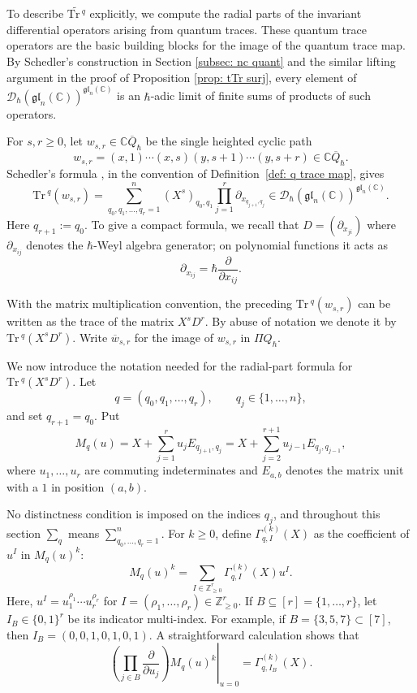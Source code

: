 \documentclass[11pt,reqno]{amsart}
\theoremstyle{definition}
\newcommand{\bbC}{\mathbb{C}}
\newcommand{\bbZ}{\mathbb{Z}}
\newcommand{\gl}{\mathfrak{gl}}
\newcommand{\Tr}{\mathrm{Tr} \,}
\newcommand{\mD}{\mathcal{D}}
\newcommand{\qneck}{{\mathbb{C} \overline{Q}}_{\hbar}}
\begin{document}
To describe \(\widetilde{\Tr^q}\) explicitly, we compute the radial parts of the
invariant differential operators arising from quantum traces.
These quantum trace operators are the basic building blocks for the image of the quantum trace map.
By Schedler's construction in Section \ref{subsec: nc quant} and the similar lifting argument in the proof of Proposition \ref{prop: tTr surj},
every element of
\(\mD_\hbar (\gl_n (\bbC))^{\gl_n (\bbC)}\) is an
\(\hbar\)-adic limit of finite sums of products of such operators.


For \(s,r \geq 0\), let \(w_{s,r}\in\qneck\) be the
single heighted cyclic path
\[
w_{s,r}
=
(x,1)\cdots(x,s)(y,s+1)\cdots(y,s+r) \in \qneck.
\]
Schedler's formula \cite[Eq.~(3.12)]{Sch2005}, in the convention of
Definition~\ref{def: q trace map}, gives
\begin{equation}\label{for: trace w_sr}
	\Tr^q(w_{s,r})
	=
	\sum_{q_0,q_1,\ldots,q_r=1}^n
	(X^s)_{q_0,q_1}
	\prod_{j=1}^r\partial_{x_{q_{j+1},q_j}}
	\in\mD_\hbar(\gl_n (\bbC))^{\gl_n (\bbC)}.
\end{equation}
Here \(q_{r+1}:=q_0\).
To give a compact formula, we recall that
\(
	D=(\partial_{x_{ji}})
\)
where \(\partial_{x_{ij}}\) denotes the
\(\hbar\)-Weyl algebra generator; on polynomial functions it acts as
\[
\partial_{x_{ij}}
=
\hbar\frac{\partial}{\partial x_{ij}}.
\]

With the matrix multiplication convention, the preceding \(\Tr^q(w_{s,r})\) can be written as the trace of the matrix \(X^s D^r\).
By abuse of notation we denote it by
\(\Tr^q(X^sD^r)\).  
Write \(\overline w_{s,r}\) for the image of \(w_{s,r}\) in
\(\Pi Q_{\hbar}\).




We now introduce the notation needed for the radial-part formula for
\(\Tr^q(X^sD^r)\).
Let
\[
q=(q_0,q_1,\ldots,q_r),\qquad q_j\in\{1,\ldots,n\},
\]
and set \(q_{r+1}=q_0\). Put
\[
M_q(u)
=
X+\sum_{j=1}^{r}u_jE_{q_{j+1},q_j}
=
X+\sum_{j=2}^{r+1}u_{j-1}E_{q_j,q_{j-1}},
\]
where \(u_1,\ldots,u_r\) are commuting indeterminates and
\(E_{a,b}\) denotes the matrix unit with a \(1\) in position
\((a,b)\).


No distinctness condition is imposed on the indices \(q_j\), and throughout this section \(\sum_q\) means \(\sum_{q_0,\dots,q_r=1}^n\).
For \(k\geq0\), define \(\Gamma_{q,I}^{(k)}(X)\) as the coefficient of \(u^I\)
in \(M_q(u)^k\):
\[
	M_q(u)^k
	=
	\sum_{I\in\bbZ_{\geq0}^r}
	\Gamma_{q,I}^{(k)}(X)u^I.
\]
Here, \(u^I=u_1^{\rho_1}\cdots u_r^{\rho_r}\) for
\(I=(\rho_1,\dots,\rho_r)\in\bbZ_{\geq 0}^r\).
If \(B\subseteq [r]=\{1,\dots,r\}\), let \(I_B\in\{0,1\}^r\) be its
indicator multi-index.
For example, if \(B=\{3,5,7\}\subset [7]\), then \(I_B=(0,0,1,0,1,0,1)\). 
A straightforward calculation shows that
\[
\left.
\left(\prod_{j\in B}\frac{\partial}{\partial u_j}\right)
M_q(u)^k
\right|_{u=0}
=
\Gamma_{q,I_B}^{(k)}(X).
\]
\end{document}
